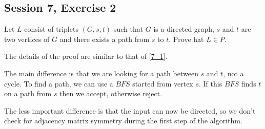 \subsection {Session 7, Exercise 2}


Let $L$ consist of triplets $(G,s,t)$ such that $G$ is a directed graph, $s$ and $t$ are two vertices of $G$ and there exists a path from $s$ to $t$. Prove hat $L \in{} P$.


The details of the proof are similar to that of \ref{7_1}.

The main difference is that we are looking for a path between $s$ and $t$, not a cycle. To find a path, we can use a $BFS$ started from vertex $s$. If this $BFS$ finds $t$ on a path from $s$ then we accept, otherwise reject.

The less important difference is that the input can now be directed, so we don't check for adjacency matrix symmetry during the first step of the algorithm.